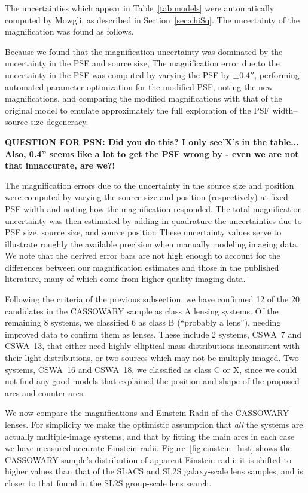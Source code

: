 \documentclass[iop]{emulateapj}
\def\theapplet{{\sc Mowgli}\xspace}
\def\QUERY#1#2{{\bf QUESTION FOR {#1}: {#2}}}
\begin{document}


The uncertainties which appear in Table~\ref{tab:models} were automatically
computed by \theapplet, as described in Section~\ref{sec:chiSq}. The uncertainty
of the magnification was found as follows.

Because we found that the magnification uncertainty was dominated by the
uncertainty in the PSF and source size, The magnification error due to the
uncertainty in the PSF was computed by varying the PSF by  $\pm0.4''$,
performing automated parameter optimization for the modified PSF, noting the
new magnifications, and comparing the modified magnifications with that of the
original model to emulate approximately the full exploration of the PSF
width--source size degeneracy. 

\QUERY{PSN}{Did you do this? I only see'X's in the table... Also, 0.4'' seems
like a lot to get the PSF wrong by - even we are not that innaccurate, are
we?!}

The magnification
errors due to the uncertainty in the source size and position were computed by
varying the source size and position (respectively) at fixed PSF width and
noting how the magnification responded. The total magnification uncertainty was
then estimated by adding in quadrature the uncertainties due to PSF size, source
size, and source position These uncertainty values serve to illustrate roughly
the available precision when manually modeling imaging data. We note that the
derived error bars are
not high enough to account for the differences between our magnification
estimates and those in the published literature, many of which come from
higher quality imaging data.

Following the criteria of the previous subsection,  we have confirmed 12 of
the 20 candidates in the CASSOWARY sample as class A lensing systems.   Of the
remaining 8 systems, we classified 6 as class B (``probably a lens''), 
needing improved data to confirm them as lenses. These include 2 systems,
CSWA~7 and CSWA~13,  that either need highly elliptical mass distributions
inconsistent with their light distributions, or two sources which may not be
multiply-imaged.  Two systems, CSWA~16 and CSWA~18, we classified as class C
or X, since we could not find any good models that explained the position and
shape of the proposed arcs and counter-arcs.

We now compare the magnifications and Einstein Radii of the CASSOWARY lenses.
For simplicity we make the optimistic assumption that {\it all} the systems
are actually multiple-image systems, and that by fitting the main arcs in each
case we have measured accurate Einstein radii. Figure~\ref{fig:einstein_hist}
shows the CASSOWARY sample's distribution  of apparent Einstein radii: it is
shifted to higher values than that of the SLACS and SL2S galaxy-scale lens
samples,  and is closer to that found in the SL2S group-scale lens search.
\end{document}
